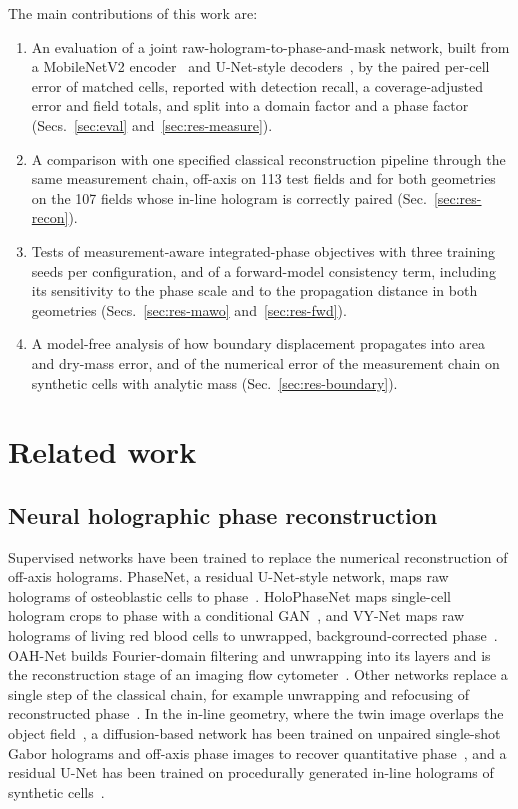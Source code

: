 \documentclass[11pt]{article}
\begin{document}
\noindent The main contributions of this work are:
\begin{enumerate}[leftmargin=*, itemsep=2pt, topsep=3pt]
\item An evaluation of a joint raw-hologram-to-phase-and-mask network, built
from a MobileNetV2 encoder~\cite{sandler2018mobilenetv2} and U-Net-style
decoders~\cite{ronneberger2015unet}, by the paired per-cell error of matched
cells, reported with detection recall, a coverage-adjusted error and field
totals, and split into a domain factor and a phase factor
(Secs.~\ref{sec:eval} and~\ref{sec:res-measure}).
\item A comparison with one specified classical reconstruction pipeline through
the same measurement chain, off-axis on 113 test fields and for both geometries
on the 107 fields whose in-line hologram is correctly paired
(Sec.~\ref{sec:res-recon}).
\item Tests of measurement-aware integrated-phase objectives with three training
seeds per configuration, and of a forward-model consistency term, including its
sensitivity to the phase scale and to the propagation distance in both
geometries (Secs.~\ref{sec:res-mawo} and~\ref{sec:res-fwd}).
\item A model-free analysis of how boundary displacement propagates into area
and dry-mass error, and of the numerical error of the measurement chain on
synthetic cells with analytic mass (Sec.~\ref{sec:res-boundary}).
\end{enumerate}


\section{Related work}
\label{sec:related}

\subsection{Neural holographic phase reconstruction}
\label{sec:rw-recon}

Supervised networks have been trained to replace the numerical reconstruction
of off-axis holograms. PhaseNet, a residual U-Net-style network, maps raw
holograms of osteoblastic cells to phase~\cite{di2021phasenet}. HoloPhaseNet
maps single-cell hologram crops to phase with a conditional
GAN~\cite{jaferzadeh2022holophasenet}, and VY-Net maps raw holograms of living
red blood cells to unwrapped, background-corrected phase~\cite{zhao2023vynet}.
OAH-Net builds Fourier-domain filtering and unwrapping into its layers and is
the reconstruction stage of an imaging flow
cytometer~\cite{delikoyun2025rthad}. Other networks replace a single step of the
classical chain, for example unwrapping and refocusing of reconstructed
phase~\cite{park2021unwrapgan}. In the in-line geometry, where the twin image
overlaps the object field~\cite{lee2013qpi}, a diffusion-based network has been
trained on unpaired single-shot Gabor holograms and off-axis phase images to
recover quantitative phase~\cite{park2026simple}, and a residual U-Net has been
trained on procedurally generated in-line holograms of synthetic
cells~\cite{svistunov2026holocel}.
\end{document}
